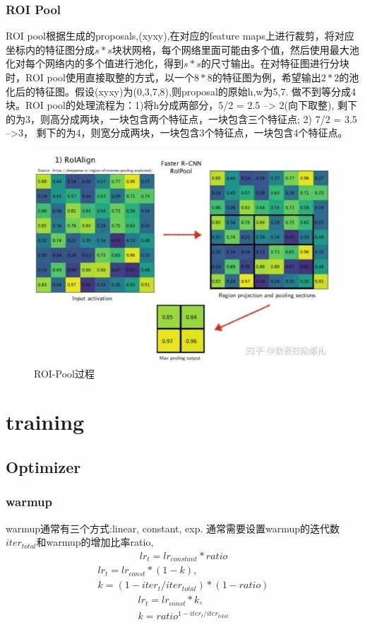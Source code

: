 \documentclass{article}
\begin{document}
\subsubsection{ROI Pool}
ROI pool根据生成的proposals,(xyxy),在对应的feature maps上进行裁剪，将对应坐标内的特征图分成$s*s$块状网格，每个网络里面可能由多个值，然后使用最大池化对每个网络内的多个值进行池化，得到$s*s$的尺寸输出。在对特征图进行分块时，ROI pool使用直接取整的方式，以一个$8*8$的特征图为例，希望输出$2*2$的池化后的特征图。假设(xyxy)为(0,3,7,8),则proposal的原始h,w为5,7. 做不到等分成4块。ROI pool的处理流程为：1)将h分成两部分，5/2 = 2.5 --> 2(向下取整), 剩下的为3，则高分成两块，一块包含两个特征点，一块包含三个特征点; 2) 7/2 = 3.5 -->3， 剩下的为4，则宽分成两块，一块包含3个特征点，一块包含4个特征点。
\begin{figure}
\centering
\includegraphics[scale=0.5]{images/roipool.jpg}
\caption{ROI-Pool过程}
\label{Fig.roi_pool}
\end{figure}

\section{training}
\subsection{Optimizer}
\subsubsection{warmup}
warmup通常有三个方式:linear, constant, exp. 通常需要设置warmup的迭代数$iter_{total}$和warmup的增加比率ratio,
\begin{align}
lr_t = lr_{constant}*ratio
\end{align}
\begin{equation}
\begin{aligned}
lr_t = lr_{const}*(1-k), \\
k= (1-iter_t /iter_{total}) * (1-ratio)
\end{aligned}
\end{equation}
\begin{align}
lr_t = lr_{const}*k, \\
k=ratio^{1-iter_t/iter_{total}}
\end{align}
\end{document}
